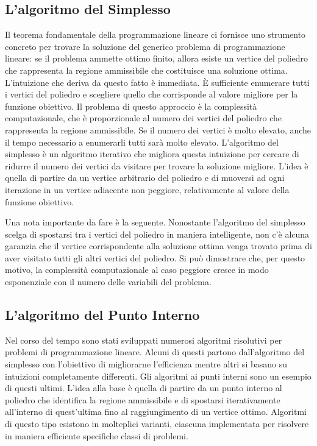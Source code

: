 \subsection{L'algoritmo del Simplesso}
Il teorema fondamentale della programmazione lineare ci fornisce uno
strumento concreto per trovare la soluzione del generico problema
di programmazione lineare: se il problema ammette ottimo
finito, allora esiste un vertice del poliedro che rappresenta la regione
ammissibile che costituisce una soluzione ottima. L'intuizione che deriva
da questo fatto è immediata. \`E sufficiente enumerare tutti i vertici del
poliedro e scegliere quello che corrisponde al valore migliore per la
funzione obiettivo. Il problema di questo approccio è la complessità
computazionale, che è proporzionale al numero dei vertici del poliedro che
rappresenta la regione ammissibile. Se il numero dei vertici è molto
elevato, anche il tempo necessario a enumerarli tutti sarà molto elevato.
L'algoritmo del simplesso è un algoritmo iterativo che migliora questa
intuizione per cercare di ridurre il numero dei vertici da visitare per
trovare la soluzione migliore. L'idea è quella di partire da un vertice
arbitrario del poliedro e di muoversi ad ogni iterazione in un vertice
adiacente non peggiore, relativamente al valore della funzione obiettivo.

Una nota importante da fare è la seguente. Nonostante l'algoritmo del
simplesso scelga di spostarsi tra i vertici del poliedro in maniera
intelligente, non c'è alcuna garanzia che il vertice corrispondente alla
soluzione ottima venga trovato prima di aver visitato tutti gli altri
vertici del poliedro. Si può dimostrare che, per questo motivo, la
complessità computazionale al caso peggiore cresce in modo esponenziale con
il numero delle variabili del problema.

\subsection{L'algoritmo del Punto Interno}
Nel corso del tempo sono stati sviluppati numerosi algoritmi risolutivi per
problemi di programmazione lineare. Alcuni di questi partono dall'algoritmo
del simplesso con l'obiettivo di migliorarne l'efficienza  mentre altri si
basano su intuizioni completamente differenti. Gli algoritmi ai punti
interni sono un esempio di questi ultimi. L'idea alla base è quella di
partire da un punto interno al poliedro che identifica la regione
ammissibile e di spostarsi iterativamente all'interno di quest'ultima
fino al raggiungimento di un vertice ottimo. Algoritmi di
questo tipo esistono in molteplici varianti, ciascuna implementata per
risolvere in maniera efficiente specifiche classi di problemi.

